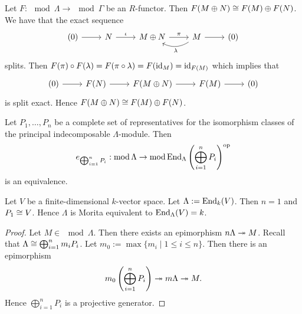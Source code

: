 
\begin{remark}
  Let $F : \mod{\Lambda} \to \mod{\Gamma}$ be an $R$-functor. Then $F(M \oplus N) \cong F(M) \oplus F(N)$. We have that the exact sequence
  \[
  \begin{tikzcd}
    (0) \rar& N \rar["\iota"]& M \oplus N \rar["\pi"]& M \lar["\lambda", bend left] \rar& (0)
  \end{tikzcd}
  \]
  splits. Then $F(\pi) \circ F(\lambda) = F(\pi \circ \lambda) = F(\operatorname{id}_M) = \operatorname{id}_{F(M)}$ which implies that
  \[
  \begin{tikzcd}
  (0) \rar& F(N) \rar& F(M \oplus N) \rar& F(M) \rar& (0)
  \end{tikzcd}
  \]
  is split exact. Hence $F(M \oplus N) \cong F(M) \oplus F(N)$.
\end{remark}


\begin{corollary}\label{3.2.5}
  Let $P_1, \ldots, P_n$ be a complete set of representatives for the isomorphism
  classes of the principal indecomposable $\Lambda$-module. Then
  \[
  e_{\bigoplus_{i=1}^n P_i} :
  \operatorname{mod}{\Lambda} \to \operatorname{mod}{\operatorname{End}_\Lambda{\left(\bigoplus_{i=1}^n P_i\right)}^{\mathrm{op}}}
  \] is an equivalence.
\end{corollary}


\begin{example}
  Let $V$ be a finite-dimensional $k$-vector space. Let $\Lambda := \operatorname{End}_k(V)$. Then $n = 1$ and $P_1 \cong V$.
  Hence $\Lambda$ is Morita equivalent to $\operatorname{End}_\Lambda(V) = k$.
\end{example}


\begin{proof}
  Let $M \in \mod{\Lambda}$. Then there exists an epimorphism $n\Lambda \twoheadrightarrow M$. Recall that $\Lambda \cong
  \bigoplus_{i=1}^n m_i P_i$. Let $m_0 := \max\{m_i \mid 1 \leq i \leq n\}$. Then there is an
  epimorphism
  \[
  m_0\left(\bigoplus_{i=1}^n P_i\right) \twoheadrightarrow m \Lambda \twoheadrightarrow M.
  \]
  Hence $\bigoplus_{i=1}^n P_i$ is a projective generator.
\end{proof}

